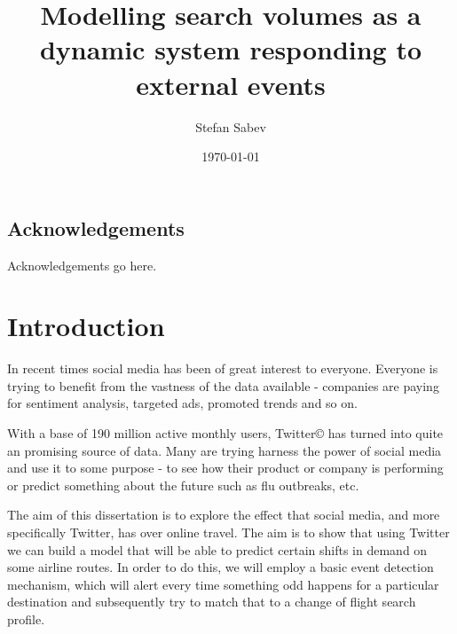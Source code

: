 \documentclass[minf,frontabs,twoside,singlespacing,parskip]{infthesis}
\begin{document}
\title{Modelling search volumes as a dynamic system responding to external events}

\author{Stefan Sabev}


\date{\today}


\maketitle

\section*{Acknowledgements}
Acknowledgements go here. 

\tableofcontents


\chapter{Introduction}

In recent times social media has been of great interest to everyone. Everyone is trying to benefit from the vastness of the data available - companies are paying for sentiment analysis, targeted ads, promoted trends and so on. 

With a base of 190 million active monthly users, Twitter{\copyright} has turned into quite an promising source of data. Many are trying harness the power of social media and use it to some purpose - to see how their product or company is performing or predict something about the future such as flu outbreaks, etc.

The aim of this dissertation is to explore the effect that social media, and more specifically Twitter, has over online travel. The aim is to show that using Twitter we can build a model that will be able to predict certain shifts in demand on some airline routes. In order to do this, we will employ a basic event detection mechanism, which will alert every time something odd happens for a particular destination and subsequently try to match that to a change of flight search profile. 
\end{document}
